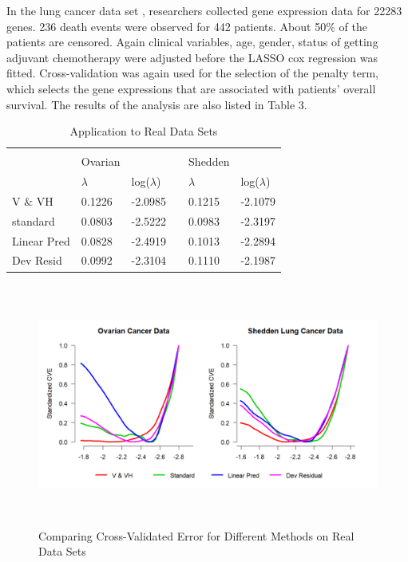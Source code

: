 \par In the lung cancer data set , researchers collected gene expression data for 22283 genes. 236 death events were observed for 442 patients. About 50$\%$ of the patients are censored. Again clinical variables, age, gender, status of getting adjuvant chemotherapy were adjusted before the LASSO cox regression was fitted. Cross-validation was again used for the selection of the penalty term, which selects the gene expressions that are associated with patients' overall survival. The results of the analysis are also listed in Table 3.

\begin{table}[h]
\centering
\caption{Application to Real Data Sets}
\label{my-label}
\begin{tabular}{llllll}
\hline
\\[-0.75em]
 & Ovarian & & & Shedden&  \\
& $\lambda$ & log($\lambda$) &  &$\lambda$  &  log($\lambda$)   \\ \cline{2-3} \cline{5-6} 
V $\&$ VH &0.1226 & -2.0985 && 0.1215 & -2.1079\\
standard & 0.0803 & -2.5222 && 0.0983 & -2.3197\\
Linear Pred &0.0828 & -2.4919 && 0.1013 & -2.2894\\
Dev Resid & 0.0992 & -2.3104 && 0.1110 & -2.1987\\ \hline
\end{tabular}
\end{table}

\begin{figure}[h]
    \centering
		\includegraphics[height= 8cm ]{./figures/figure_5.png}
    \caption{Comparing Cross-Validated Error for Different Methods on Real Data Sets}
\end{figure}	

